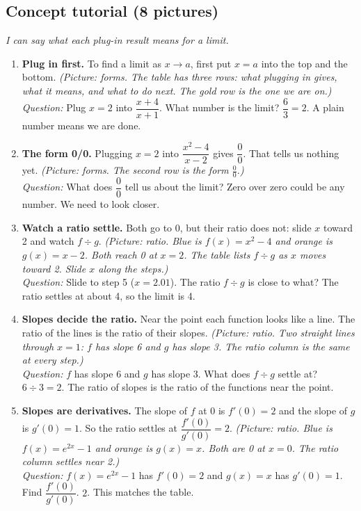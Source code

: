 \documentclass[11pt]{article}
\begin{document}
\subsection*{Concept tutorial (8 pictures)}
\textit{I can say what each plug-in result means for a limit.}\par
\begin{enumerate}
\item \textbf{Plug in first.} To find a limit as $x\to a$, first put $x=a$ into the top and the bottom. \textit{(Picture: forms. The table has three rows: what plugging in gives, what it means, and what to do next. The gold row is the one we are on.)}\\ \textit{Question:} Plug $x=2$ into $\dfrac{x+4}{x+1}$. What number is the limit?  $\dfrac{6}{3}=2$. A plain number means we are done.
\item \textbf{The form 0/0.} Plugging $x=2$ into $\dfrac{x^2-4}{x-2}$ gives $\dfrac00$. That tells us nothing yet. \textit{(Picture: forms. The second row is the form $\frac00$.)}\\ \textit{Question:} What does $\dfrac00$ tell us about the limit?  Zero over zero could be any number. We need to look closer.
\item \textbf{Watch a ratio settle.} Both go to 0, but their ratio does not: slide $x$ toward 2 and watch $f\div g$. \textit{(Picture: ratio. Blue is $f(x)=x^2-4$ and orange is $g(x)=x-2$. Both reach 0 at $x=2$. The table lists $f\div g$ as $x$ moves toward 2. Slide $x$ along the steps.)}\\ \textit{Question:} Slide to step 5 ($x=2.01$). The ratio $f\div g$ is close to what?  The ratio settles at about 4, so the limit is 4.
\item \textbf{Slopes decide the ratio.} Near the point each function looks like a line. The ratio of the lines is the ratio of their slopes. \textit{(Picture: ratio. Two straight lines through $x=1$: $f$ has slope 6 and $g$ has slope 3. The ratio column is the same at every step.)}\\ \textit{Question:} $f$ has slope 6 and $g$ has slope 3. What does $f\div g$ settle at?  $6\div3=2$. The ratio of slopes is the ratio of the functions near the point.
\item \textbf{Slopes are derivatives.} The slope of $f$ at 0 is $f'(0)=2$ and the slope of $g$ is $g'(0)=1$. So the ratio settles at $\dfrac{f'(0)}{g'(0)}=2$. \textit{(Picture: ratio. Blue is $f(x)=e^{2x}-1$ and orange is $g(x)=x$. Both are 0 at $x=0$. The ratio column settles near 2.)}\\ \textit{Question:} $f(x)=e^{2x}-1$ has $f'(0)=2$ and $g(x)=x$ has $g'(0)=1$. Find $\dfrac{f'(0)}{g'(0)}$.  $2$. This matches the table.

\end{enumerate}
\end{document}
